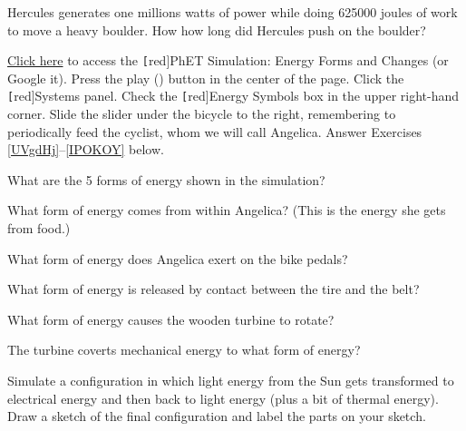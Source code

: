 \documentclass[main.tex]{subfiles}
\begin{document}
\begin{exercise} \label{b9UIEt}
    Hercules generates one millions watts of power while doing \SI{625000}{} joules of work to move a heavy boulder. How how long did Hercules push on the boulder?
\end{exercise}
\cyanhrule


\href{https://phet.colorado.edu/en/simulations/energy-forms-and-changes}{Click here} to access the \texttt[red]{PhET Simulation: Energy Forms and Changes} (or Google it). Press the play ({\tiny \faPlay}) button in the center of the page. Click the \texttt[red]{Systems} panel. Check the \texttt[red]{Energy Symbols} box in the upper right-hand corner. Slide the slider under the bicycle to the right, remembering to periodically feed the cyclist, whom we will call Angelica. Answer Exercises \ref{UVgdHj}--\ref{IPOKOY} below.


\begin{exercise} \label{UVgdHj}
    What are the 5 forms of energy shown in the simulation?
\end{exercise}

\begin{exercise}
    What form of energy comes from within Angelica? (This is the energy she gets from food.)
\end{exercise}

\begin{exercise}
    What form of energy does Angelica exert on the bike pedals?
\end{exercise}

\begin{exercise}
    What form of energy is released by contact between the tire and the belt? 
\end{exercise}

\begin{exercise}
    What form of energy causes the wooden turbine to rotate?
\end{exercise}

\begin{exercise}
    The turbine coverts mechanical energy to what form of energy?
\end{exercise}

\begin{exercise}
    Simulate a configuration in which light energy from the Sun gets transformed to electrical energy and then back to light energy (plus a bit of thermal energy). Draw a sketch of the final configuration and label the parts on your sketch.
\end{exercise}
\end{document}
